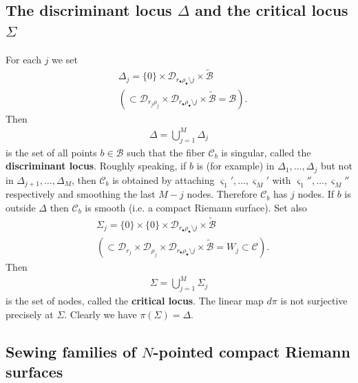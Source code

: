 \documentclass[12pt,b5paper,notitlepage]{report}
\theoremstyle{definition}
\theoremstyle{plain}
\newcommand{\mc}{\mathcal}
\newcommand{\wtd}{\widetilde}
\newcommand{\sgm}{\varsigma}
\newcommand{\blt}{\bullet}
\numberwithin{equation}{section}
\begin{document}
\subsection*{The discriminant locus $\Delta$ and the critical locus $\Sigma$}


For each $j$ we set
\begin{align*}
&\Delta_j=\{0\}\times \mc D_{r_\blt\rho_\blt\setminus j}\times\wtd{\mc B}\\
& (\subset\mc D_{r_j\rho_j}\times\mc D_{r_\bullet\rho_\bullet\setminus j}\times\wtd{\mc B}=\mc B).
\end{align*}
Then 
\begin{align}
\Delta=\bigcup_{j=1}^M\Delta_j\label{eq132}
\end{align}
is the set of all points $b\in\mc B$ such that the fiber $\mc C_b$ is singular, called the \textbf{discriminant locus}. Roughly speaking, if $b$ is (for example) in $\Delta_1,\dots,\Delta_j$ but not in $\Delta_{j+1},\dots,\Delta_M$, then  $\mc C_b$ is obtained  by attaching $\sgm_1',\dots,\sgm_M'$ with $\sgm_1'',\dots,\sgm_M''$ respectively and smoothing the last $M-j$ nodes. Therefore $\mc C_b$ has $j$ nodes. If $b$ is outside $\Delta$ then $\mc C_b$ is smooth (i.e. a compact Riemann surface). Set also 
\begin{align*}
&\Sigma_j=\{0\}\times\{0\}\times\mc D_{r_\blt\rho_\blt\setminus j}\times\wtd{\mc B}\\
&(\subset\mc D_{r_j}\times\mc D_{\rho_j}\times\mc D_{r_\bullet\rho_\bullet\setminus j}\times\wtd{\mc B}=W_j\subset\mc C).
\end{align*}
Then 
\begin{align*}
\Sigma=\bigcup_{j=1}^M\Sigma_j
\end{align*}
is the set of nodes, called the \textbf{critical locus}. The linear map $d\pi$  is not surjective precisely at $\Sigma$. Clearly we have $\pi(\Sigma)=\Delta$.




\subsection*{Sewing families of $N$-pointed compact Riemann surfaces}
\end{document}
